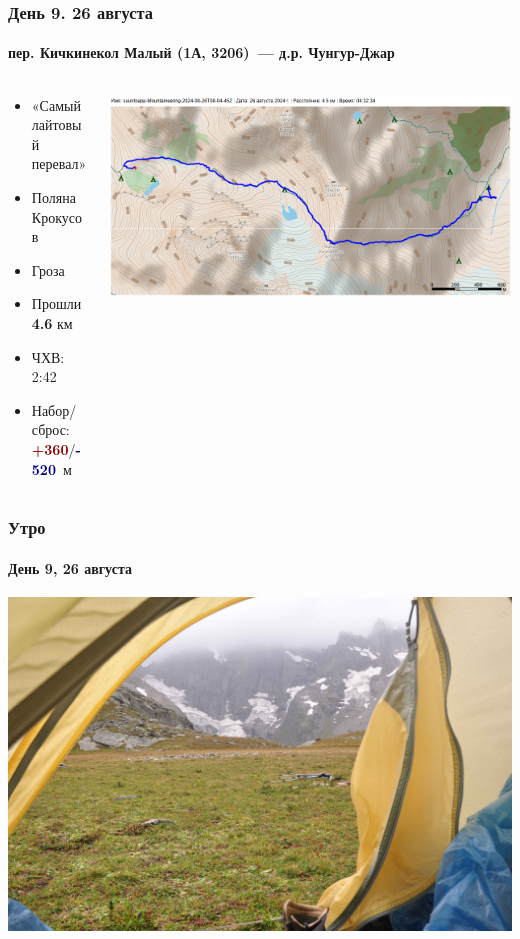 	\begin{frame}
	\frametitle{День 9. 26 августа}
	\framesubtitle{\textbf{пер. Кичкинекол Малый (1А, 3206)}~--- д.р. Чунгур-Джар} %
	\begin{columns}[c] %
		\begin{column}{0.55\textwidth} %
			\begin{itemize}
				\item «Самый лайтовый перевал»
				\item Поляна Крокусов
				\item Гроза
				\item Прошли \textbf{4.6} км
				\item ЧХВ: 2:42
				\item Набор/сброс: \textcolor{darkred}{\textbf{+360}}/\textcolor{darkblue}{\textbf{-520}}~м
			\end{itemize}
			
		\end{column}
		\begin{column}{0.45\textwidth} %
			\centering
			\includegraphics[width=\linewidth]{../pics/mini_maps/26}
		\end{column}
	\end{columns}
\end{frame}

\begin{frame}
	\frametitle{Утро}
	\framesubtitle{День 9, 26 августа}
	\centering
	\includegraphics[width=\textwidth]{../pics/DSC_0190}			
\end{frame}

